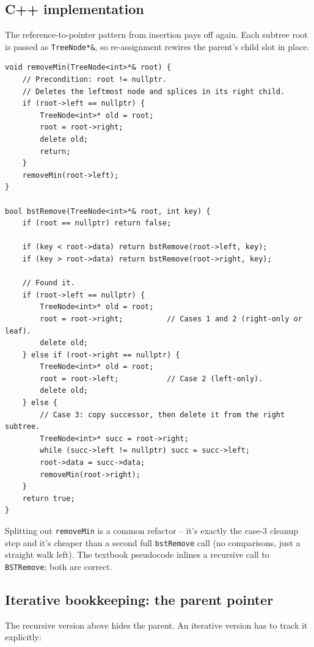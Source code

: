 \documentclass[11pt]{article}
\begin{document}
\subsection*{C++ implementation}

The reference-to-pointer pattern from insertion pays off again. Each subtree root is passed as \texttt{TreeNode*\&}, so re-assignment rewires the parent's child slot in place.

\begin{lstlisting}
void removeMin(TreeNode<int>*& root) {
    // Precondition: root != nullptr.
    // Deletes the leftmost node and splices in its right child.
    if (root->left == nullptr) {
        TreeNode<int>* old = root;
        root = root->right;
        delete old;
        return;
    }
    removeMin(root->left);
}

bool bstRemove(TreeNode<int>*& root, int key) {
    if (root == nullptr) return false;

    if (key < root->data) return bstRemove(root->left, key);
    if (key > root->data) return bstRemove(root->right, key);

    // Found it.
    if (root->left == nullptr) {
        TreeNode<int>* old = root;
        root = root->right;          // Cases 1 and 2 (right-only or leaf).
        delete old;
    } else if (root->right == nullptr) {
        TreeNode<int>* old = root;
        root = root->left;           // Case 2 (left-only).
        delete old;
    } else {
        // Case 3: copy successor, then delete it from the right subtree.
        TreeNode<int>* succ = root->right;
        while (succ->left != nullptr) succ = succ->left;
        root->data = succ->data;
        removeMin(root->right);
    }
    return true;
}
\end{lstlisting}

\begin{notebox}
Splitting out \texttt{removeMin} is a common refactor -- it's exactly the case-3 cleanup step and it's cheaper than a second full \texttt{bstRemove} call (no comparisons, just a straight walk left). The textbook pseudocode inlines a recursive call to \texttt{BSTRemove}; both are correct.
\end{notebox}

\subsection*{Iterative bookkeeping: the parent pointer}

The recursive version above hides the parent. An iterative version has to track it explicitly:
\end{document}
